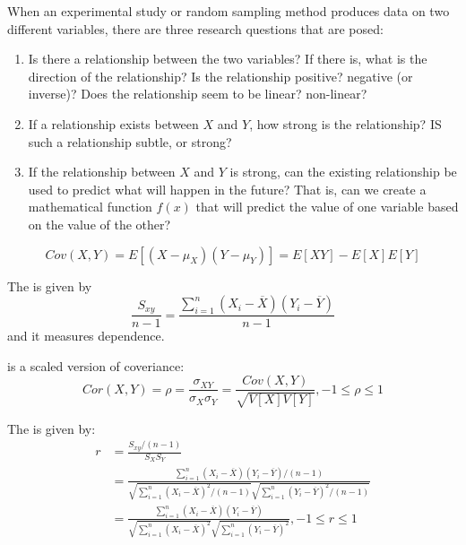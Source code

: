 \documentclass[12pt, a4paper, twoside, openright, titlepage]{book}
\begin{document}
\begin{rmk}{}{}
    When an experimental study or random sampling method produces data on two different variables, there are three research questions that are posed: \begin{enumerate}
        \item Is there a relationship between the two variables? If there is, what is the direction of the relationship? Is the relationship positive? negative (or inverse)? Does the relationship seem to be linear? non-linear?
        \item If a relationship exists between $X$ and $Y$, how strong is the relationship? IS such a relationship subtle, or strong?
        \item If the relationship between $X$ and $Y$ is strong, can the existing relationship be used to predict what will happen in the future? That is, can we create a mathematical function $f(x)$ that will predict the value of one variable based on the value of the other?
    \end{enumerate}
\end{rmk}

\begin{rec}{}{}
    $$Cov(X,Y) = E[(X-\mu_X)(Y-\mu_Y)] = E[XY] - E[X]E[Y]$$
\end{rec}

\begin{defn}{}{}
    The  is given by \begin{equation*}
        \frac{S_{xy}}{n-1} = \frac{\sum_{i=1}^n(X_i-\overline{X})(Y_i-\overline{Y})}{n-1}
    \end{equation*}
    and it measures dependence.
\end{defn}

\begin{defn}{}{}
     is a scaled version of coveriance: \begin{equation*}
        Cor(X,Y) = \rho = \frac{\sigma_{XY}}{\sigma_X\sigma_Y} = \frac{Cov(X,Y)}{\sqrt{V[X]V[Y]}}, -1\leq \rho \leq 1
    \end{equation*}
\end{defn}

\begin{defn}{}{}
    The  is given by: \begin{align*}
        r &= \frac{S_{xy}/(n-1)}{S_XS_Y} \\
        &= \frac{\sum_{i=1}^n(X_i-\overline{X})(Y_i-\overline{Y})/(n-1)}{\sqrt{\sum_{i=1}^n(X_i-\overline{X})^2/(n-1)}\sqrt{\sum_{i=1}^n(Y_i-\overline{Y})^2/(n-1)}} \\
        &= \frac{\sum_{i=1}^n(X_i-\overline{X})(Y_i-\overline{Y})}{\sqrt{\sum_{i=1}^n(X_i-\overline{X})^2}\sqrt{\sum_{i=1}^n(Y_i-\overline{Y})^2}}, -1 \leq r \leq 1 
    \end{align*}
\end{defn}
\end{document}
